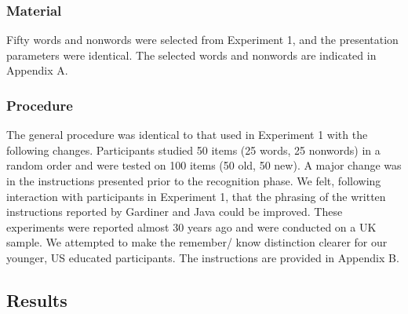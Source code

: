 \documentclass[english,,man]{apa6}
\begin{document}
\hypertarget{material-1}{%
\subsubsection{Material}\label{material-1}}

Fifty words and nonwords were selected from Experiment 1, and the presentation parameters were identical. The selected words and nonwords are indicated in Appendix A.

\hypertarget{procedure-1}{%
\subsubsection{Procedure}\label{procedure-1}}

The general procedure was identical to that used in Experiment 1 with the following changes. Participants studied 50 items (25 words, 25 nonwords) in a random order and were tested on 100 items (50 old, 50 new). A major change was in the instructions presented prior to the recognition phase. We felt, following interaction with participants in Experiment 1, that the phrasing of the written instructions reported by Gardiner and Java could be improved. These experiments were reported almost 30 years ago and were conducted on a UK sample. We attempted to make the remember/ know distinction clearer for our younger, US educated participants. The instructions are provided in Appendix B.

\hypertarget{results-1}{%
\subsection{Results}\label{results-1}}
\end{document}
